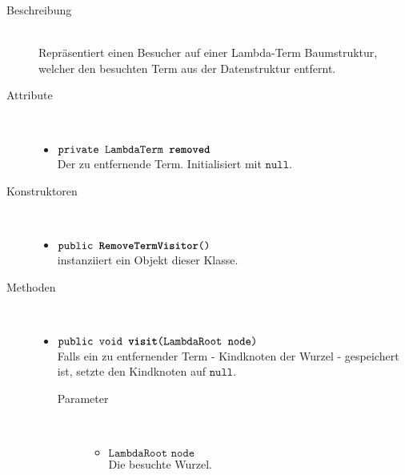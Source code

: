 \begin{description}
\item[Beschreibung] \hfill \\ Repräsentiert einen Besucher auf einer Lambda-Term Baumstruktur, welcher den besuchten Term aus der Datenstruktur entfernt.

\item[Attribute] \hfill \\
	\vspace{-.8cm}
	\begin{itemize}
		\item $\texttt{private LambdaTerm \textbf{removed}}$ \\ Der zu entfernende Term. Initialisiert mit $\texttt{null}$.
	\end{itemize}

\item[Konstruktoren] \hfill \\
	\vspace{-.8cm}
	\begin{itemize}
		\item $\texttt{public \textbf{RemoveTermVisitor}()}$ \\ instanziiert ein Objekt dieser Klasse.
	\end{itemize}

\item[Methoden] \hfill \\
	\vspace{-.8cm}
	\begin{itemize}
		\item $\texttt{public void \textbf{visit}(LambdaRoot node)}$ \\ Falls ein zu entfernender Term - Kindknoten der Wurzel - gespeichert ist, setzte den Kindknoten auf $\texttt{null}$.
		\begin{description}
			\item[Parameter] \hfill \\
			\vspace{-.8cm}
			\begin{itemize}
				\item $\texttt{LambdaRoot node}$ \\ Die besuchte Wurzel.
			\end{itemize}
		\end{description}
				

\end{itemize}
\end{description}
